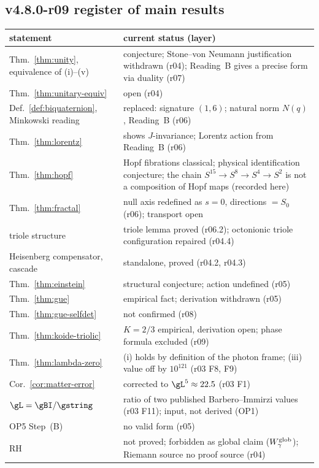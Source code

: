 \subsection*{v4.8.0-r09 register of main results}
\label{subsec:v480-r09-results}

\begin{center}
\small
\begin{tabular}{@{}>{\raggedright\arraybackslash}p{}>{\raggedright\arraybackslash}p{}@{}}
\toprule
statement & current status (layer)\\
\midrule
Thm.~\ref{thm:unity}, equivalence of (i)--(v) & conjecture; Stone--von Neumann justification withdrawn (r04); Reading~B gives a precise form via duality (r07)\\
Thm.~\ref{thm:unitary-equiv} & open (r04)\\
Def.~\ref{def:biquaternion}, Minkowski reading & replaced: signature \((1,6)\); natural norm \(N(q)\), Reading~B (r06)\\
Thm.~\ref{thm:lorentz} & shows \(J\)-invariance; Lorentz action from Reading~B (r06)\\
Thm.~\ref{thm:hopf} & Hopf fibrations classical; physical identification conjecture; the chain \(S^{15}\to S^8\to S^4\to S^2\) is not a composition of Hopf maps (recorded here)\\
Thm.~\ref{thm:fractal} & null axis redefined as \(s=0\), directions \(=S_0\) (r06); transport open\\
triole structure & triole lemma proved (r06.2); octonionic triole configuration repaired (r04.4)\\
Heisenberg compensator, cascade & standalone, proved (r04.2, r04.3)\\
Thm.~\ref{thm:einstein} & structural conjecture; action undefined (r05)\\
Thm.~\ref{thm:gue} & empirical fact; derivation withdrawn (r05)\\
Thm.~\ref{thm:gue-selfdet} & not confirmed (r08)\\
Thm.~\ref{thm:koide-triolic} & \(K=2/3\) empirical, derivation open; phase formula excluded (r09)\\
Thm.~\ref{thm:lambda-zero} & (i) holds by definition of the photon frame; (iii) value off by \(10^{121}\) (r03 F8, F9)\\
Cor.~\ref{cor:matter-error} & corrected to \(\gL^5\approx22.5\) (r03 F1)\\
\(\gL=\gBI/\gstring\) & ratio of two published Barbero--Immirzi values (r03 F11); input, not derived (OP1)\\
OP5 Step~(B) & no valid form (r05)\\
RH & not proved; forbidden as global claim (\(W_\gamma^{\rm glob}\)); Riemann source no proof source (r04)\\
\bottomrule
\end{tabular}
\end{center}

